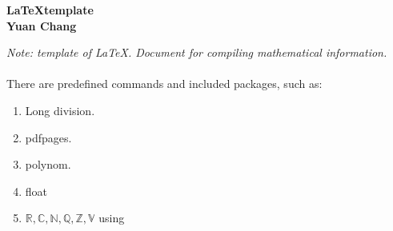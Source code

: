 \documentclass[12 pt]{article}
\newcommand{\R}{\mathbb R} %
\newcommand{\C}{\mathbb C} %
\newcommand{\N}{\mathbb N} %
\newcommand{\Q}{\mathbb Q} %
\newcommand{\Z}{\mathbb Z} %
\newcommand{\V}{\mathbb V}
\begin{document}
\begin{flushright}
\textbf{\LaTeX  template\\
Yuan Chang\\}
\end{flushright}

\textit{Note: template of \LaTeX. Document for compiling mathematical information.}
\\
\\
There are predefined commands and included packages, such as:
\begin{enumerate}
	\item Long division.
	\item pdfpages.
	\item polynom.
	\item float
	\item $\R, \C, \N, \Q, \Z, \V$ using 
\end{enumerate}
\end{document}
